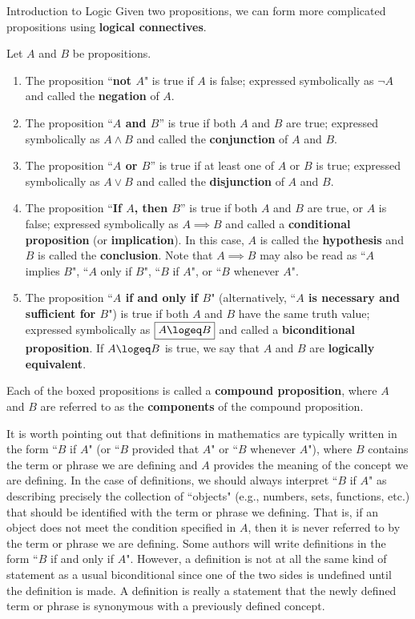 \begin{section}{Introduction to Logic}
Given two propositions, we can form more complicated propositions using \textbf{logical connectives}.

\begin{definition}\label{def:logical connectives}
Let $A$ and $B$ be propositions.  
\begin{enumerate}[label=\textrm{(\alph*)}]
\item The proposition ``\textbf{not $A$}" is true if $A$ is false; expressed symbolically as $\boxed{\neg A}$ and called the \textbf{negation} of $A$.
\item The proposition ``\textbf{$A$ and $B$}'' is true if both $A$ and $B$ are true; expressed symbolically as $\boxed{A \wedge B}$ and called the \textbf{conjunction} of $A$ and $B$.
\item The proposition ``\textbf{$A$ or $B$}'' is true if at least one of $A$ or $B$ is true; expressed symbolically as $\boxed{A \vee B}$ and called the \textbf{disjunction} of $A$ and $B$.
\item\label{def:conditional} The proposition ``\textbf{If $A$, then $B$}'' is true if both $A$ and $B$ are true, or $A$ is false; expressed symbolically as $\boxed{A \implies B}$ and called a \textbf{conditional proposition} (or \textbf{implication}). In this case, $A$ is called the \textbf{hypothesis} and $B$ is called the \textbf{conclusion}. Note that $A \implies B$ may also be read as ``$A$ implies $B$", ``$A$ only if $B$", ``$B$ if $A$", or ``$B$ whenever $A$". 
\item\label{def:logically equivalent} The proposition ``\textbf{$A$ if and only if $B$}" (alternatively, ``\textbf{$A$ is necessary and sufficient for $B$}") is true if both $A$ and $B$ have the same truth value; expressed symbolically as $\boxed{A\logeq B}$ and called a \textbf{biconditional proposition}. If $A\logeq B$ is true, we say that $A$ and $B$ are \textbf{logically equivalent}.
\end{enumerate}
Each of the boxed propositions is called a \textbf{compound proposition}, where $A$ and $B$ are referred to as the \textbf{components} of the compound proposition.
\end{definition}

It is worth pointing out that definitions in mathematics are typically written in the form ``$B$ if $A$" (or ``$B$ provided that $A$" or ``$B$ whenever $A$"), where $B$ contains the term or phrase we are defining and $A$ provides the meaning of the concept we are defining. In the case of definitions, we should always interpret ``$B$ if $A$" as describing precisely the collection of ``objects" (e.g., numbers, sets, functions, etc.) that should be identified with the term or phrase we defining.  That is, if an object does not meet the condition specified in $A$, then it is never referred to by the term or phrase we are defining. Some authors will write definitions in the form ``$B$ if and only if $A$". However, a definition is not at all the same kind of statement as a usual biconditional since one of the two sides is undefined until the definition is made. A definition is really a statement that the newly defined term or phrase is synonymous with a previously defined concept.


\end{section}
